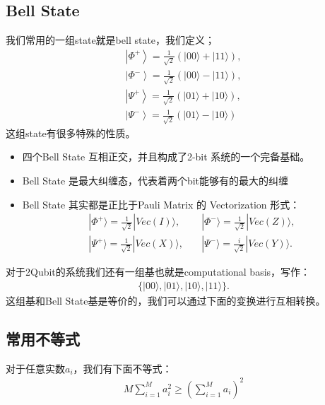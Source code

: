 \subsection{Bell State}

我们常用的一组state就是bell state，我们定义；
\begin{align}
  \left|\Phi^{+}\right\rangle=\frac{1}{\sqrt{2}}(|00\rangle+|11\rangle),\\
  \left|\Phi^{-}\right\rangle=\frac{1}{\sqrt{2}}(|00\rangle-|11\rangle),\\
  \left|\Psi^{+}\right\rangle=\frac{1}{\sqrt{2}}(|01\rangle+|10\rangle),\\
  \left|\Psi^{-}\right\rangle=\frac{1}{\sqrt{2}}(|01\rangle-|10\rangle)
\end{align}
这组state有很多特殊的性质。
\begin{itemize}
  \item 四个Bell State 互相正交，并且构成了2-bit 系统的一个完备基础。
  \item Bell State 是最大纠缠态，代表着两个bit能够有的最大的纠缠
  \item Bell State 其实都是正比于Pauli Matrix 的 Vectorization 形式：
    \begin{align}
      |\Phi^+\rangle = \frac{1}{\sqrt{2}} |Vec(I)\rangle,\quad&
      |\Phi^-\rangle = \frac{1}{\sqrt{2}} |Vec(Z)\rangle, \\
      |\Psi^+\rangle = \frac{1}{\sqrt{2}} |Vec(X)\rangle,\quad&
      |\Psi^-\rangle = \frac{i}{\sqrt{2}} |Vec(Y)\rangle.
    \end{align}
\end{itemize}

对于2Qubit的系统我们还有一组基也就是computational basis，写作：
\begin{align}
  \{|00\rangle, |01\rangle, |10\rangle, |11\rangle\}.
\end{align}
这组基和Bell State基是等价的，我们可以通过下面的变换进行互相转换。

\subsection{常用不等式}

\bigskip
{}

对于任意实数$ a_i $，我们有下面不等式：
\begin{align}
  M\sum_{i=1}^Ma_i^2\geq\left(\sum_{i=1}^Ma_i\right)^2
\end{align}
